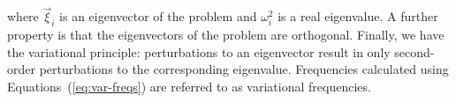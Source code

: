 where $\vec\xi_i$ %
is an eigenvector of the problem and $\omega^2_i$ %
is a real eigenvalue. 
A further property is that the eigenvectors of the problem are orthogonal. 
Finally, we have the variational principle: perturbations to an eigenvector result in only second-order perturbations to the corresponding eigenvalue. %
Frequencies calculated using Equations~(\ref{eq:var-freqs}) are referred to as variational frequencies. 


